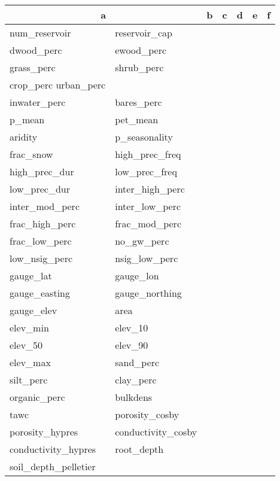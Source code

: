 \begin{tabular}{ll|lllll}
\hline 
\multicolumn {2}{c}{a}  &  b & c & d & e & f \\
\hline
num\_reservoir & reservoir\_cap \\
 dwood\_perc & ewood\_perc\\
 grass\_perc & shrub\_perc\\
 crop\_perc urban\_perc \\
 inwater\_perc &bares\_perc \\
 p\_mean & pet\_mean \\
 aridity & p\_seasonality \\
 frac\_snow & high\_prec\_freq \\
 high\_prec\_dur & low\_prec\_freq \\
 low\_prec\_dur & inter\_high\_perc \\
 inter\_mod\_perc & inter\_low\_perc \\
 frac\_high\_perc & frac\_mod\_perc \\
 frac\_low\_perc & no\_gw\_perc \\
 low\_nsig\_perc & nsig\_low\_perc\\
 gauge\_lat & gauge\_lon\\
 gauge\_easting & gauge\_northing \\
 gauge\_elev & area \\
 elev\_min & elev\_10 \\
 elev\_50 & elev\_90 \\
 elev\_max & sand\_perc \\
 silt\_perc & clay\_perc \\
 organic\_perc & bulkdens \\
 tawc & porosity\_cosby \\
 porosity\_hypres & conductivity\_cosby \\
 conductivity\_hypres & root\_depth \\
 soil\_depth\_pelletier
\end{tabular}

